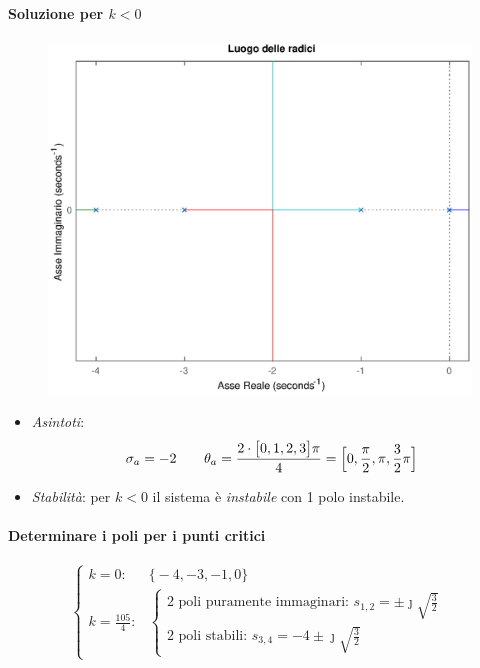 \begin{esercizio}
\paragraph{Soluzione per \(k < 0\)}

\begin{figure}[ht]
	\centering
	\includegraphics[scale=.6]{mod1/assets/rl_ex38n}
\end{figure}

\begin{itemize}
	\item \emph{Asintoti}:
		\[
			\sigma_a = -2 \qquad \theta_a = \frac{2\cdot\bigl[ 0,1,2,3 \bigr]\pi}{4} = \Bigl[ 0,\frac{\pi}{2},\pi,\frac{3}{2}\pi \Bigr]
		\]
	\item \emph{Stabilità}: per \(k < 0\) il sistema è \emph{instabile} con 1 polo instabile.
\end{itemize}

\paragraph{Determinare i poli per i punti critici}
\[\begin{cases}
	k = 0\colon & \bigl\{ -4,-3,-1,0 \bigr\} \\
	k = \frac{105}{4}\colon & \begin{cases}
		\text{2 poli puramente immaginari: } s_{1,2} = \pm\jmath\sqrt{\frac{3}{2}} \\
		\text{2 poli stabili: } s_{3,4} = -4 \pm\jmath\sqrt{\frac{3}{2}}
	\end{cases}
\end{cases}\]
\end{esercizio}


